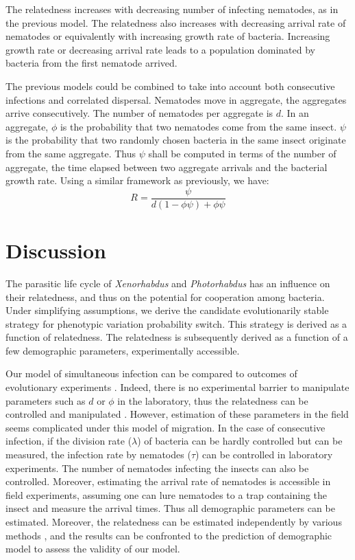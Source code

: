 \documentclass[10pt]{article}
\newcommand{\Xeno}{\textit{Xenorhabdus} }
\newcommand{\Photo}{\textit{Photorhabdus} }
\newcommand{\psis}{\psi}
\begin{document}
\begin{multicols}{2}
The relatedness increases with decreasing number of infecting nematodes, as in the previous model.
The relatedness also increases with decreasing arrival rate of nematodes or equivalently with increasing growth rate of bacteria.
Increasing growth rate or decreasing arrival rate leads to a population dominated by bacteria from the first nematode arrived.

The previous models could be combined to take into account both consecutive infections and correlated dispersal.
Nematodes move in aggregate, the aggregates arrive consecutively. The number of nematodes per aggregate is $d$.
In an aggregate, $\phi$ is the probability that two nematodes come from the same insect.
$\psis$ is the probability that two randomly chosen bacteria in the same insect originate from the same aggregate.
Thus $\psi$ shall be computed in terms of the number of aggregate, the time elapsed between two aggregate arrivals and the bacterial growth rate.
Using a similar framework as previously, we have:
\begin{equation}
   R = \dfrac{\psi}{d(1-\phi \psi)+\phi \psi}
\end{equation}
\section*{Discussion}
The parasitic life cycle of \Xeno and \Photo has an influence on their relatedness, and thus on the potential for cooperation among bacteria.
Under simplifying assumptions, we derive the candidate evolutionarily stable strategy for phenotypic variation probability switch.
This strategy is derived as a function of relatedness. The relatedness is subsequently derived as a function of a few demographic parameters, experimentally accessible.

Our model of simultaneous infection can be compared to outcomes of evolutionary experiments \cite{Vigneux2008}. Indeed, there is no experimental barrier to manipulate parameters such as $d$ or $\phi$ in the laboratory, thus the relatedness can be controlled and manipulated \cite{Vigneux2008}.
However, estimation of these parameters in the field seems complicated under this model of migration.
In the case of consecutive infection, if the division rate ($\lambda$) of bacteria can be hardly controlled but can be measured, the infection rate by nematodes ($\tau$) can be controlled in laboratory experiments.
The number of nematodes infecting the insects can also be controlled.
Moreover, estimating the arrival rate of nematodes is accessible in field experiments, assuming one can lure nematodes to a trap containing the insect and measure the arrival times.
Thus all demographic parameters can be estimated. 
Moreover, the relatedness can be estimated independently by various methods \cite{pamilo1982measuring}, and the results can be confronted to the prediction of demographic model to assess the validity of our model.


\end{multicols}
\end{document}
